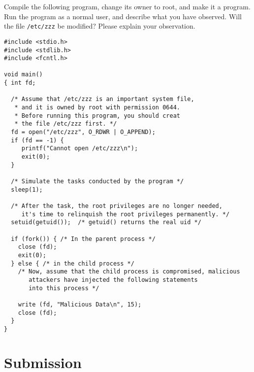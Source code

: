 Compile the following program, change its owner to root, and
make it a \setuid program. Run the program as a normal user,
and describe what you have observed.
Will the file {\tt /etc/zzz} be modified? Please explain
your observation.

\begin{lstlisting}
#include <stdio.h>
#include <stdlib.h>
#include <fcntl.h>

void main()
{ int fd;

  /* Assume that /etc/zzz is an important system file,
   * and it is owned by root with permission 0644.
   * Before running this program, you should creat
   * the file /etc/zzz first. */
  fd = open("/etc/zzz", O_RDWR | O_APPEND);
  if (fd == -1) {
     printf("Cannot open /etc/zzz\n");
     exit(0);
  }

  /* Simulate the tasks conducted by the program */
  sleep(1);

  /* After the task, the root privileges are no longer needed,
     it's time to relinquish the root privileges permanently. */
  setuid(getuid());  /* getuid() returns the real uid */

  if (fork()) { /* In the parent process */
    close (fd);
    exit(0);
  } else { /* in the child process */
    /* Now, assume that the child process is compromised, malicious
       attackers have injected the following statements
       into this process */

    write (fd, "Malicious Data\n", 15);
    close (fd);
  }
}
\end{lstlisting}



\section{Submission}


\seedsubmission





